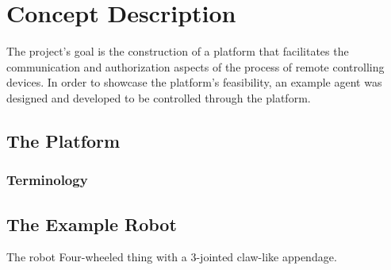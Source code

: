 \chapter{Concept Description}
The project's goal is the construction of a platform that facilitates the communication and authorization aspects of the process of remote controlling devices.
In order to showcase the platform's feasibility, an example agent was designed and developed to be controlled through the platform.
\section{The Platform}



\subsection{Terminology}


\section{The Example Robot}

The robot 
Four-wheeled thing with a 3-jointed claw-like appendage.

